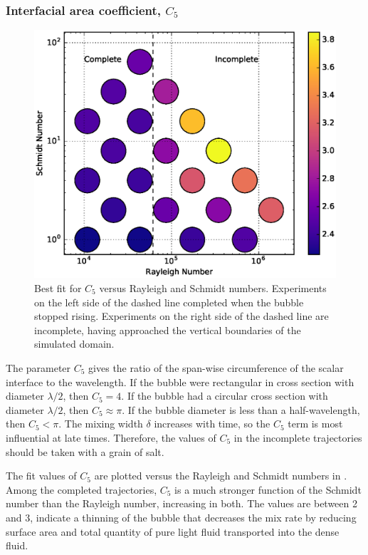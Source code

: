 \subsubsection{Interfacial area coefficient, $C_5$}
\begin{figure}
\includegraphics[width=\columnwidth]{figs/C5-vs-Rayleigh-Schmidt}
\caption{ 
  Best fit for $C_5$ versus Rayleigh and Schmidt numbers.
  Experiments on the left side of the dashed line completed when the bubble stopped rising.
  Experiments on the right side of the dashed line are incomplete, having approached the vertical boundaries of the simulated domain.
}
\end{figure}

The parameter $C_5$ gives the ratio of the span-wise circumference of the scalar interface to the wavelength.
If the bubble were rectangular in cross section with diameter $\lambda / 2$, then $C_5 = 4$.
If the bubble had a circular cross section with diameter $\lambda / 2$, then $C_5 \approx \pi$.
If the bubble diameter is less than a half-wavelength, then $C_5 < \pi$.
The mixing width $\delta$ increases with time, so the $C_5$ term is most influential at late times.
Therefore, the values of $C_5$ in the incomplete trajectories should be taken with a grain of salt.

The fit values of $C_5$ are plotted versus the Rayleigh and Schmidt numbers in .
Among the completed trajectories, $C_5$ is a much stronger function of the Schmidt number than the Rayleigh number, increasing in both.
The values are between 2 and 3, indicate a thinning of the bubble that decreases the mix rate by reducing surface area and total quantity of pure light fluid transported into the dense fluid.

